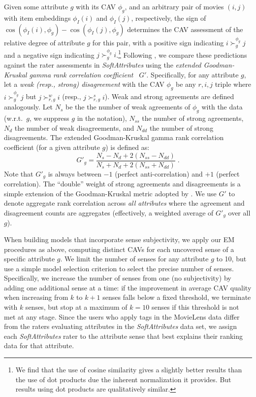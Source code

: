 \documentclass[manuscript,screen,nonacm]{acmart}
\newcommand{\1}{{\mathbf 1}}
\theoremstyle{TheoremNum}
\begin{document}
Given some attribute $g$ with its CAV $\phi_g$, and an arbitrary pair of movies $(i,j)$ with item embeddings $\phi_I(i)$ and $\phi_I(j)$, respectively, the sign of
$\cos(\phi_I(i), \phi_g) - \cos(\phi_I(j), \phi_g)$ determines the CAV assessment of the relative degree of attribute $g$ for this pair, with a positive sign indicating $i \succ^{\phi_g}_g j$ and a negative sign indicating $j \succ^{\phi_g}_g i$.\footnote{We find that the use of cosine similarity gives a slightly better results than the use of dot products due the inherent normalization it provides. But results using dot products are qualitatively similar.}
%
Following \cite{sigir21:filipandkristian}, we compare these predictions against the rater assessments in \emph{SoftAttributes} using the \emph{extended Goodman-Kruskal gamma rank correlation coefficient}~\cite{goodman_kruskal_rank} $G'$. Specifically, for any attribute $g$, let a \emph{weak (resp., strong) disagreement} with the CAV $\phi_g$ be any $r,i,j$ triple where  $i \succ^{\phi_g}_g j$ but $j \succ^w_{r,g} i$ (resp., $j \succ^s_{r,g} i$). Weak and strong agreements are defined analogously. 
Let $N_s$ be the the number of weak agreements of $\phi_g$ with the data (w.r.t.\ $g$, we suppress $g$ in the notation), 
$N_{ss}$ the number of strong agreements,
$N_d$ the number of weak disagreements, and
$N_{dd}$ the number of strong disagreements. The extended Goodman-Kruskal gamma rank correlation coefficient (for a given attribute $g$) is defined as:
\begin{equation*}
G'_g = \frac{N_s - N_d + 2(N_{ss} - N_{dd})}{N_s + N_d + 2(N_{ss} + N_{dd})}\;.
\end{equation*}
Note that $G'_g$ is always between $-1$ (perfect anti-correlation) and $+1$ (perfect correlation). The ``double'' weight of strong agreements and disagreements is a simple extension of the Goodman-Kruskal metric adopted by \citet{sigir21:filipandkristian}. We use $G'$ to denote aggregate rank correlation across \emph{all attributes} where the agreement and disagreement counts are aggregates (effectively, a weighted average of $G'_g$ over all $g$). 

When building models that incorporate sense subjectivity, we apply our EM procedures as above, computing distinct CAVs for each uncovered sense of a specific attribute $g$. We limit the number of senses for any attribute $g$ to 10, but use a simple model selection criterion to select the precise number of senses. Specifically, we increase the number of senses from one (no subjectivity) by adding one additional sense at a time: if the improvement in average CAV quality when increasing from $k$ to $k+1$ senses falls below a fixed threshold, we terminate with $k$ senses, but stop at a maximum of $k=10$ senses if this threshold is not met at any stage. Since the users who apply tags in the MovieLens data differ from the raters evaluating attributes in the \emph{SoftAttributes} data set, we assign each \emph{SoftAttributes} rater to the attribute sense that best explains their ranking data for that attribute.
\end{document}
